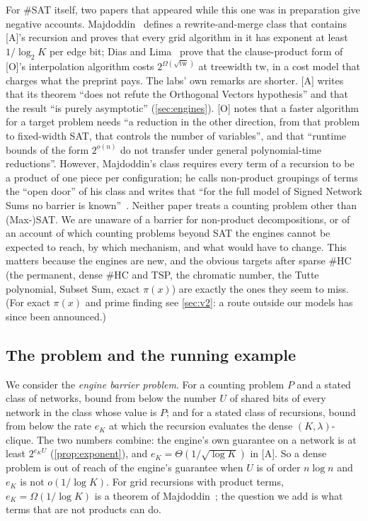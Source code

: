 \documentclass[10pt]{amsart}
\theoremstyle{plain}
\theoremstyle{definition}
\theoremstyle{remark}
\numberwithin{equation}{section}
\newcommand{\A}{\textup{[A]}}
\newcommand{\Oa}{\textup{[O]}}
\begin{document}
For \#SAT itself, two papers that appeared while this one was in preparation give negative accounts.
Majdoddin~\cite{Maj26} defines a rewrite-and-merge class that contains \A's recursion and proves that
every grid algorithm in it has exponent at least $1/\log_2K$ per edge bit; Dias and Lima~\cite{DL26}
prove that the clause-product form of \Oa's interpolation algorithm costs $2^{\Omega(\sqrt{\mathrm{tw}})}$
at treewidth $\mathrm{tw}$, in a cost model that charges what the preprint pays. The labs' own remarks
are shorter. \A{} writes that its theorem ``does not refute the Orthogonal Vectors hypothesis'' and that
the result ``is purely asymptotic'' (\cref{sec:engines}). \Oa{} notes that a faster algorithm for a
target problem needs ``a reduction in the other direction, from that problem to fixed-width SAT,
that controls the number of variables'', and that ``runtime bounds of the form $2^{o(n)}$ do not
transfer under general polynomial-time reductions''. However, Majdoddin's class requires every term of
a recursion to be a product of one piece per configuration; he calls non-product groupings of terms
the ``open door'' of his class and writes that ``for the full model of Signed Network Sums no barrier
is known''~\cite[\S4.8]{Maj26}. Neither paper treats a counting problem other than (Max-)SAT. We are unaware of a barrier for non-product decompositions, or
of an account of which counting problems beyond SAT the engines cannot be expected to reach, by which
mechanism, and what would have to change. This matters because the engines are new, and the obvious
targets after sparse \#HC (the permanent, dense \#HC and TSP, the chromatic number, the Tutte
polynomial, Subset Sum, exact $\pi(x)$) are exactly the ones they seem to miss. (For exact $\pi(x)$
and prime finding see \cref{sec:v2}: a route outside our models has since been announced.)

\subsection{The problem and the running example}
We consider the \emph{engine barrier problem}. For a counting problem $P$ and a stated class of
networks, bound from below the number $U$ of shared bits of every network in the class whose value
is $P$; and for a stated class of recursions, bound from below the rate $e_K$ at which the recursion
evaluates the dense $(K,\lambda)$-clique. The two numbers combine: the engine's own guarantee on a
network is at least $2^{e_K U}$ (\cref{prop:exponent}), and $e_K=\Theta(1/\sqrt{\log K})$ in \A.
So a dense problem is out of reach of the engine's guarantee when $U$ is of order $n\log n$ and $e_K$
is not $o(1/\log K)$. For grid recursions with product terms, $e_K=\Omega(1/\log K)$ is a theorem of
Majdoddin~\cite[Theorem~4.13]{Maj26}; the question we add is what terms that are not products can do.
\end{document}
